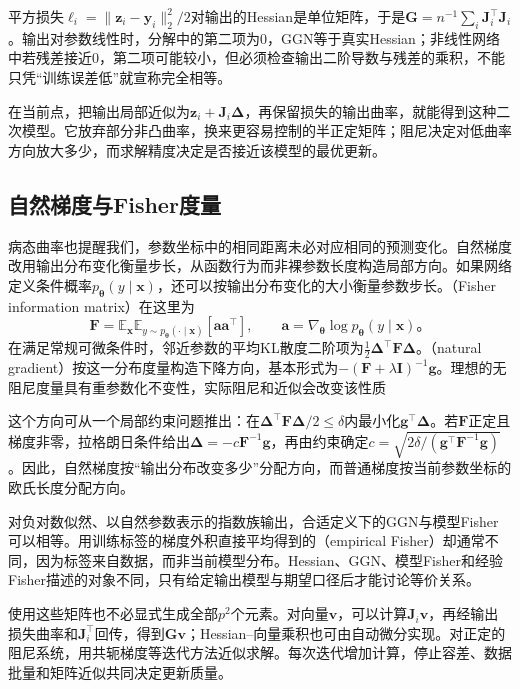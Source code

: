 平方损失$\ell_i=\lVert\bm z_i-\bm y_i\rVert_2^2/2$对输出的Hessian是单位矩阵，于是$\bm G=n^{-1}\sum_i\bm J_i^{\top}\bm J_i$。输出对参数线性时，分解中的第二项为0，GGN等于真实Hessian；非线性网络中若残差接近0，第二项可能较小，但必须检查输出二阶导数与残差的乘积，不能只凭“训练误差低”就宣称完全相等。

在当前点，把输出局部近似为$\bm z_i+\bm J_i\bm\Delta$，再保留损失的输出曲率，就能得到这种二次模型。它放弃部分非凸曲率，换来更容易控制的半正定矩阵；阻尼决定对低曲率方向放大多少，而求解精度决定是否接近该模型的最优更新。

\subsection{自然梯度与Fisher度量}
\label{sec:training-natural-gradient}

病态曲率也提醒我们，参数坐标中的相同距离未必对应相同的预测变化。自然梯度改用输出分布变化衡量步长，从函数行为而非裸参数长度构造局部方向。如果网络定义条件概率$p_{\bm\theta}(y\mid\bm x)$，还可以按输出分布变化的大小衡量参数步长。（Fisher information matrix）在这里为
\begin{equation}
  \bm F=\mathbb E_{\bm x}\mathbb E_{y\sim p_{\bm\theta}(\cdot\mid\bm x)}
    [\bm a\bm a^{\top}],\qquad
  \bm a=\nabla_{\bm\theta}\log p_{\bm\theta}(y\mid\bm x)\text{。}
  \label{eq:training-fisher}
\end{equation}
在满足常规可微条件时，邻近参数的平均KL散度二阶项为$\tfrac12\bm\Delta^{\top}\bm F\bm\Delta$。（natural gradient）按这一分布度量构造下降方向，基本形式为$-(\bm F+\lambda\bm I)^{-1}\bm g$。理想的无阻尼度量具有重参数化不变性，实际阻尼和近似会改变该性质

这个方向可从一个局部约束问题推出：在$\bm\Delta^{\top}\bm F\bm\Delta/2\leq\delta$内最小化$\bm g^{\top}\bm\Delta$。若$\bm F$正定且梯度非零，拉格朗日条件给出$\bm\Delta=-c\bm F^{-1}\bm g$，再由约束确定$c=\sqrt{2\delta/(\bm g^{\top}\bm F^{-1}\bm g)}$。因此，自然梯度按“输出分布改变多少”分配方向，而普通梯度按当前参数坐标的欧氏长度分配方向。

对负对数似然、以自然参数表示的指数族输出，合适定义下的GGN与模型Fisher可以相等。用训练标签的梯度外积直接平均得到的（empirical Fisher）却通常不同，因为标签来自数据，而非当前模型分布。Hessian、GGN、模型Fisher和经验Fisher描述的对象不同，只有给定输出模型与期望口径后才能讨论等价关系。

使用这些矩阵也不必显式生成全部$p^2$个元素。对向量$\bm v$，可以计算$\bm J_i\bm v$，再经输出损失曲率和$\bm J_i^{\top}$回传，得到$\bm G\bm v$；Hessian--向量乘积也可由自动微分实现。对正定的阻尼系统，用共轭梯度等迭代方法近似求解。每次迭代增加计算，停止容差、数据批量和矩阵近似共同决定更新质量。


